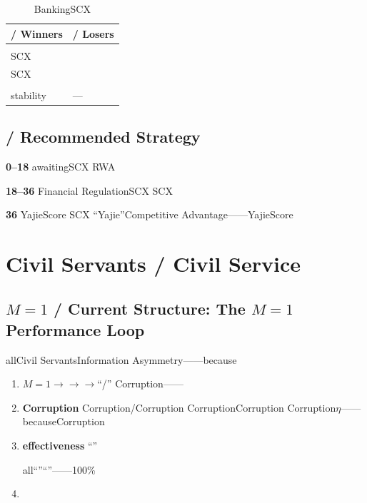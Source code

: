 \documentclass[12pt,a4paper]{article}
\theoremstyle{remark}
\begin{document}
\begin{table}[H]
\centering
\caption{BankingSCX}
\label{tab:bank_wl}
\begin{tabular}{@{}p{7cm}p{7cm}@{}}
\toprule
\textbf{ / Winners} & \textbf{ / Losers} \\
\midrule
 &  \\
\addlinespace
SCX &  \\
\addlinespace
SCX &  \\
\addlinespace
 &  \\
\addlinespace
stability & — \\
\bottomrule
\end{tabular}
\end{table}

\subsection{ / Recommended Strategy}

\textbf{0--18}
awaitingSCX
RWA

\textbf{18--36}
Financial RegulationSCX
SCX

\textbf{36}
YajieScore
SCX
``Yajie''Competitive Advantage——YajieScore

\section{Civil Servants / Civil Service}

\subsection{$M=1$ / Current Structure: The $M=1$ Performance Loop}

allCivil ServantsInformation Asymmetry——because

\begin{enumerate}[leftmargin=*, label=\textbf{(\arabic*)}]
    \item \textbf{}
    $M=1$$\to$$\to$$\to$``/''
    Corruption——
    

    \item \textbf{Corruption}
    Corruption/Corruption
    CorruptionCorruption
    Corruption$\eta$——becauseCorruption

    \item \textbf{effectiveness}
    ``''
    
    all``''``''——100\%

    \item \textbf{}
    
    
\end{enumerate}
\end{document}
